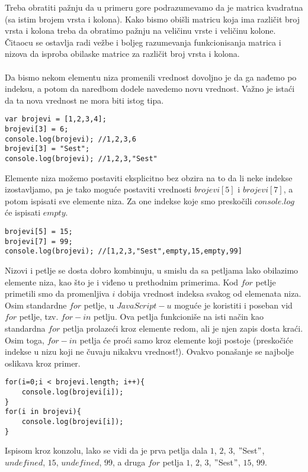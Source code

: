 Treba obratiti pažnju da u primeru gore podrazumevamo da je matrica kvadratna (sa istim brojem vrsta i kolona). Kako bismo obišli matricu koja ima različit broj vrsta i kolona treba da obratimo pažnju na veličinu vrste i veličinu kolone. Čitaocu se ostavlja radi vežbe i boljeg razumevanja funkcionisanja matrica i nizova da isproba obilaske matrice za različit broj vrsta i kolona.\\\\
Da bismo nekom elementu niza promenili vrednost dovoljno je da ga nađemo po indeksu, a potom da naredbom dodele navedemo novu vrednost. Važno je istaći da ta nova vrednost ne mora biti istog tipa.
\begin{lstlisting}[backgroundcolor = \color{lightgray}, breaklines=true]
var brojevi = [1,2,3,4];
brojevi[3] = 6;
console.log(brojevi); //1,2,3,6
brojevi[3] = "Sest";
console.log(brojevi); //1,2,3,"Sest"
\end{lstlisting}

Elemente niza možemo postaviti eksplicitno bez obzira na to da li neke indekse izostavljamo, pa je tako moguće postaviti vrednosti $brojevi[5]$ i $brojevi[7]$, a potom ispisati sve elemente niza. Za one indekse koje smo preskočili $console.log$ će ispisati $empty$.

\begin{lstlisting}[backgroundcolor = \color{lightgray}, breaklines=true]
brojevi[5] = 15;
brojevi[7] = 99;
console.log(brojevi); //[1,2,3,"Sest",empty,15,empty,99]
\end{lstlisting}

Nizovi i petlje se dosta dobro kombinuju, u smislu da sa petljama lako obilazimo elemente niza, kao što je i viđeno u prethodnim primerima. Kod $for$ petlje primetili smo da promenljiva $i$ dobija vrednost indeksa svakog od elemenata niza. Osim standardne $for$ petlje, u $JavaScript-u$ moguće je koristiti i poseban vid $for$ petlje, tzv. $for-in$ petlju. Ova petlja funkcioniše na isti način kao standardna $for$ petlja prolazeći kroz elemente redom, ali je njen zapis dosta kraći. Osim toga, $for-in$ petlja će proći samo kroz elemente koji postoje (preskočiće indekse u nizu koji ne čuvaju nikakvu vrednost!). Ovakvo ponašanje se najbolje oslikava kroz primer.
\begin{lstlisting}[backgroundcolor = \color{lightgray}, breaklines=true]
for(i=0;i < brojevi.length; i++){
	console.log(brojevi[i]); 
}
for(i in brojevi){
	console.log(brojevi[i]);
}
\end{lstlisting}
Ispisom kroz konzolu, lako se vidi da je prva petlja dala $1$, $2$, $3$, $"$Sest$"$, $undefined$, $15$, $undefined$, $99$, a druga $for$ petlja $1$, $2$, $3$, $"$Sest$"$, $15$, $99$. 
 

